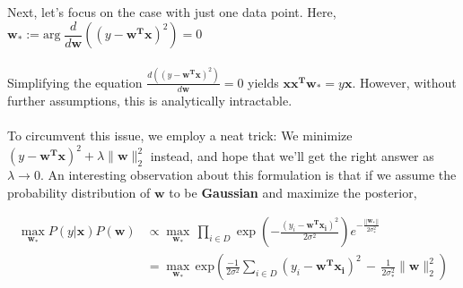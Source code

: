 \documentclass[12pt]{article}
\begin{document}
\noindent{}

\vspace{20pt}

\noindent Next, let's focus on the case with just one data point. Here, $\boldsymbol{w}_* := \mathrm{arg}\;\dfrac{d}{d\boldsymbol{w}}\left( (y-\boldsymbol{w^Tx})^2\right)  = 0$
\\ \\
Simplifying the equation $\frac{d((y-\boldsymbol{w^Tx})^2)}{d\boldsymbol{w}} = 0$ yields $\boldsymbol{xx^Tw}_* = y\boldsymbol{x}$. However, without further assumptions, this is analytically intractable.
\\ \\
To circumvent this issue, we employ a neat trick: We minimize $(y-\boldsymbol{w^Tx})^2 + \lambda\lVert\boldsymbol{w}\rVert^2_2$ instead, and hope that we'll get the right answer as $\lambda\rightarrow 0$. An interesting observation about this formulation is that if we assume the probability distribution of $\boldsymbol{w}$ to be \textbf{Gaussian} and maximize the posterior, 

\begin{align*}
    \displaystyle \max_{\boldsymbol{w_*}} P(y|\boldsymbol{x})P(\boldsymbol{w})  &\propto  \displaystyle \max_{\boldsymbol{w_*}} \hspace{2pt} \prod_{i\in D} \exp \left( {-\frac{(y_i - \boldsymbol{w^Tx_i})^2}{2\sigma^2}}\right) e^{-\frac{||\boldsymbol{w_*}||}{2\sigma_*^2}}  \\
    &= \displaystyle \max_{\boldsymbol{w_*}} \hspace{2pt}\mathrm{exp}\left(\frac{-1}{2\sigma^2}\sum_{i\in D}(y_i -\boldsymbol{w^Tx_i})^2 \hspace{2pt}-\hspace{2pt}\frac{1}{2\sigma_*^2}\lVert\boldsymbol{w}\rVert^2_2\right) \\
\end{align*}
\end{document}
